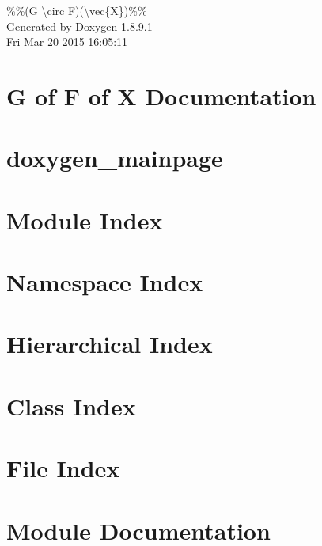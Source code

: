 \documentclass[twoside]{book}
\newcommand{\+}{\discretionary{\mbox{\scriptsize$\hookleftarrow$}}{}{}}
\newcommand{\clearemptydoublepage}{%
  \newpage{\pagestyle{empty}\cleardoublepage}%
}
\begin{document}
\hypersetup{pageanchor=false,
             bookmarks=true,
             bookmarksnumbered=true,
             pdfencoding=unicode
            }
\begin{titlepage}
\vspace*{7cm}
\begin{center}%
{\Large \%\%(G \textbackslash{}circ F)(\textbackslash{}vec\{X\})\%\% }\\
\vspace*{1cm}
{\large Generated by Doxygen 1.8.9.1}\\
\vspace*{0.5cm}
{\small Fri Mar 20 2015 16:05:11}\\
\end{center}
\end{titlepage}
\clearemptydoublepage
\tableofcontents
\clearemptydoublepage
{}
\hypersetup{pageanchor=true}

\chapter{G of F of X Documentation}
\label{index}\hypertarget{index}{}
\chapter{doxygen\+\_\+mainpage}
\label{md_doxygen_mainpage}
\hypertarget{md_doxygen_mainpage}{}

\chapter{Module Index}

\chapter{Namespace Index}

\chapter{Hierarchical Index}

\chapter{Class Index}

\chapter{File Index}

\chapter{Module Documentation}







\end{document}
